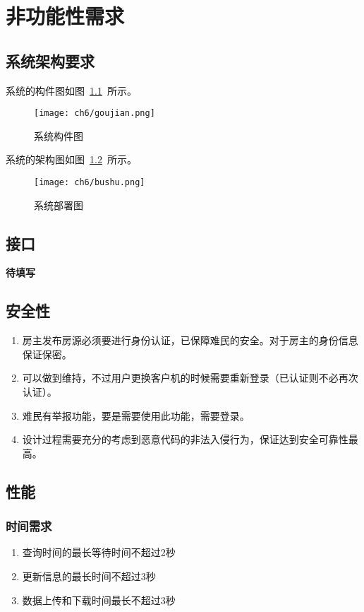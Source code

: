 \chapter{非功能性需求}
\section{系统架构要求}
系统的构件图如图~\ref{fig:goujian}~所示。
\begin{figure}[htbp]
    \centering
    \texttt{[image: ch6/goujian.png]}
    \caption{系统构件图}\label{fig:goujian}
    \vspace{\baselineskip} %
\end{figure}
系统的架构图如图~\ref{fig:jiagou}~所示。
\begin{figure}[htbp]
    \centering
    \texttt{[image: ch6/bushu.png]}
    \caption{系统部署图}\label{fig:jiagou}
    \vspace{\baselineskip} %
\end{figure}
\section{接口}
\textbf{待填写}
\section{安全性}
\begin{enumerate}
    \item 房主发布房源必须要进行身份认证，已保障难民的安全。对于房主的身份信息保证保密。
    \item 可以做到维持，不过用户更换客户机的时候需要重新登录（已认证则不必再次认证）。
    \item 难民有举报功能，要是需要使用此功能，需要登录。
    \item 设计过程需要充分的考虑到恶意代码的非法入侵行为，保证达到安全可靠性最高。
\end{enumerate}
\section{性能}
\subsection{时间需求}
\begin{enumerate}
    \item 查询时间的最长等待时间不超过2秒
    \item 更新信息的最长时间不超过3秒
    \item 数据上传和下载时间最长不超过3秒
\end{enumerate}
